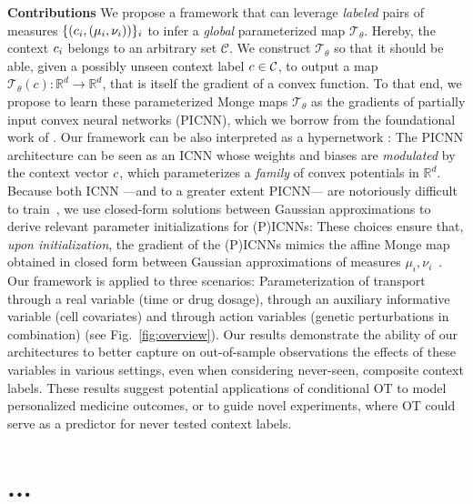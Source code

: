  \textbf{Contributions }
We propose a framework that can leverage \textit{labeled} pairs of measures $\{(c_i, (\mu_i, \nu_i))\}_i$ to infer a \textit{global} parameterized map $\mathcal{T}_{\theta}$. 
Hereby, the context $c_i$ belongs to an arbitrary set $\mathcal{C}$. We construct $\mathcal{T}_{\theta}$ so that it should be able, given a possibly unseen context label $c\in{\mathcal{C}}$, to output a map $\mathcal{T}_{\theta}(c):\mathbb{R}^d\rightarrow\mathbb{R}^d$, that is itself the gradient of a convex function. To that end, we propose to learn these parameterized Monge maps $\mathcal{T}_{\theta}$ as the gradients of partially input convex neural networks (PICNN), which we borrow from the foundational work of \citet{amos2017input}. 
%
Our framework can be also interpreted as a hypernetwork \citep{ha2016hypernetworks}: The PICNN architecture can be seen as an ICNN whose weights and biases are \textit{modulated} by the context vector $c$, which parameterizes a \textit{family} of convex potentials in $\mathbb{R}^d$.
%
Because both ICNN ---and to a greater extent PICNN--- are notoriously difficult to train~\citep{richter2021input,korotin2021wasserstein,korotin2021neural}, we use closed-form solutions between Gaussian approximations to derive relevant parameter initializations for (P)ICNNs:
These choices ensure that, \textit{upon initialization}, the gradient of the (P)ICNNs mimics the affine Monge map obtained in closed form between Gaussian approximations of measures $\mu_i,\nu_i$~\citep{gelbrich1990formula}.
%
Our framework is applied to three scenarios: Parameterization of transport through a real variable (time or drug dosage), through an auxiliary informative variable (cell covariates) and through action variables (genetic perturbations in combination) (see Fig.~\ref{fig:overview}). Our results demonstrate the ability of our architectures to better capture on out-of-sample observations the effects of these variables in various settings, even when considering never-seen, composite context labels. These results suggest potential applications of conditional OT to model personalized medicine outcomes, or to guide novel experiments, where OT could serve as a predictor for never tested context labels.

\section{...}


